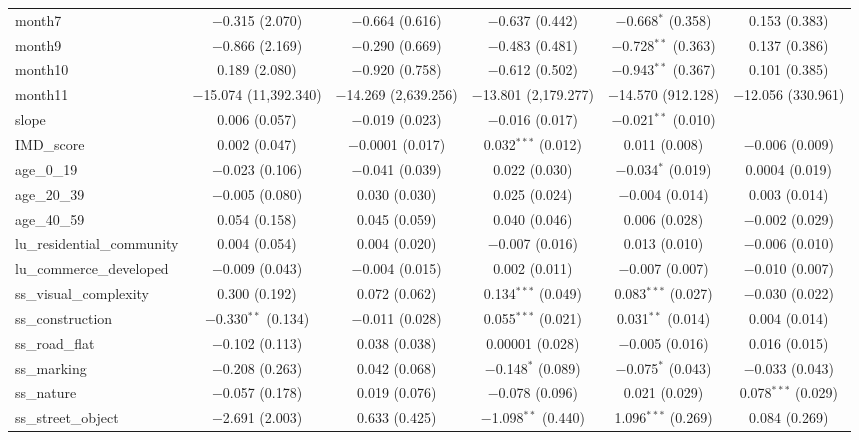 \documentclass[preprint,12pt, authoryear]{elsarticle}
\begin{document}
\begin{table}[!htbp]
{\begin{tabular}{@{\extracolsep{1pt}}lccccc}
  month7 & $-$0.315 (2.070) & $-$0.664 (0.616) & $-$0.637 (0.442) & $-$0.668$^{*}$ (0.358) & 0.153 (0.383) \\
  month9 & $-$0.866 (2.169) & $-$0.290 (0.669) & $-$0.483 (0.481) & $-$0.728$^{**}$ (0.363) & 0.137 (0.386) \\
  month10 & 0.189 (2.080) & $-$0.920 (0.758) & $-$0.612 (0.502) & $-$0.943$^{**}$ (0.367) & 0.101 (0.385) \\
  month11 & $-$15.074 (11,392.340) & $-$14.269 (2,639.256) & $-$13.801 (2,179.277) & $-$14.570 (912.128) & $-$12.056 (330.961) \\
  slope & 0.006 (0.057) & $-$0.019 (0.023) & $-$0.016 (0.017) & $-$0.021$^{**}$ (0.010) &  \\
  IMD\_score & 0.002 (0.047) & $-$0.0001 (0.017) & 0.032$^{***}$ (0.012) & 0.011 (0.008) & $-$0.006 (0.009) \\
  age\_0\_19 & $-$0.023 (0.106) & $-$0.041 (0.039) & 0.022 (0.030) & $-$0.034$^{*}$ (0.019) & 0.0004 (0.019) \\
  age\_20\_39 & $-$0.005 (0.080) & 0.030 (0.030) & 0.025 (0.024) & $-$0.004 (0.014) & 0.003 (0.014) \\
  age\_40\_59 & 0.054 (0.158) & 0.045 (0.059) & 0.040 (0.046) & 0.006 (0.028) & $-$0.002 (0.029) \\
  lu\_residential\_community & 0.004 (0.054) & 0.004 (0.020) & $-$0.007 (0.016) & 0.013 (0.010) & $-$0.006 (0.010) \\
  lu\_commerce\_developed & $-$0.009 (0.043) & $-$0.004 (0.015) & 0.002 (0.011) & $-$0.007 (0.007) & $-$0.010 (0.007) \\
  ss\_visual\_complexity & 0.300 (0.192) & 0.072 (0.062) & 0.134$^{***}$ (0.049) & 0.083$^{***}$ (0.027) & $-$0.030 (0.022) \\
  ss\_construction & $-$0.330$^{**}$ (0.134) & $-$0.011 (0.028) & 0.055$^{***}$ (0.021) & 0.031$^{**}$ (0.014) & 0.004 (0.014) \\
  ss\_road\_flat & $-$0.102 (0.113) & 0.038 (0.038) & 0.00001 (0.028) & $-$0.005 (0.016) & 0.016 (0.015) \\
  ss\_marking & $-$0.208 (0.263) & 0.042 (0.068) & $-$0.148$^{*}$ (0.089) & $-$0.075$^{*}$ (0.043) & $-$0.033 (0.043) \\
  ss\_nature & $-$0.057 (0.178) & 0.019 (0.076) & $-$0.078 (0.096) & 0.021 (0.029) & 0.078$^{***}$ (0.029) \\
  ss\_street\_object & $-$2.691 (2.003) & 0.633 (0.425) & $-$1.098$^{**}$ (0.440) & 1.096$^{***}$ (0.269) & 0.084 (0.269) \\

\end{tabular}}
\end{table}
\end{document}
